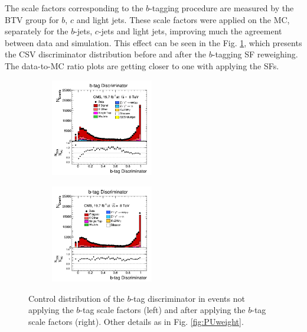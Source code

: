 \begin{itemize}
 The scale factors corresponding to the $b$-tagging procedure are measured by the BTV group \cite{CMS-PAS-BTV-13-001} for $b$, $c$ and light jets. These scale factors were applied on the MC, 
 separately for the $b$-jets, $c$-jets and light jets, improving much the agreement between data and simulation. This effect can be seen in the 
 Fig. \ref{fig:bTagDiscr}, which presents the CSV discriminator distribution before and after the $b$-tagging SF reweighing. The data-to-MC ratio plots are getting closer to one with
 applying the SFs.
 
 \begin{figure}[h]
 \centering
 \begin{subfigure}
   \centering
   \includegraphics[width=0.49\textwidth]{04_event_reconstruction/plots/bTagDiscr_step6.png}
 \end{subfigure}
 \begin{subfigure}
   \centering
   \includegraphics[width=0.49\textwidth]{04_event_reconstruction/plots/bTagDiscr_step7.png}
 \end{subfigure}
 \caption{Control distribution of the $b$-tag discriminator in events not applying the $b$-tag scale factors (left)
 and after applying the $b$-tag scale factors (right). Other details as in Fig. \ref{fig:PUweight}.}
 \label{fig:bTagDiscr}
 \end{figure}
 \end{itemize}

